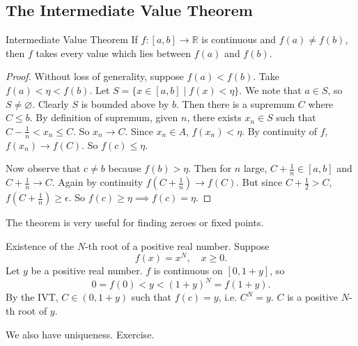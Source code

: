 \subsection{The Intermediate Value Theorem}
\leavevmode
\begin{theorem}{Intermediate Value Theorem}{}
    If \(f: [a,b]\to\mathbb{R}\) is continuous and \(f(a) \neq f(b)\), then \(f\) takes every value which lies between \(f(a)\) and \(f(b)\).
\end{theorem}
\begin{proof}
    Without loss of generality, suppose \(f(a) < f(b)\). Take \(f(a) < \eta < f(b)\). Let \(S = \{x \in [a,b]\mid f(x) < \eta\}\). We note that \(a \in S\), so \(S\neq \varnothing \). Clearly \(S\) is bounded above by \(b\). Then there is a supremum \(C\) where \(C \leq b\). By definition of supremum, given \(n\), there exists \(x_n \in S\) such that \(C - \frac{1}{n} < x_n \leq C\). So \(x_n \to C\). Since \(x_n \in A\), \(f(x_n) < \eta\). By continuity of \(f\), \(f(x_n) \to f(C)\). So \(f(c) \leq \eta\).
    
    Now observe that \(c \neq b\) because \(f(b) > \eta\). Then for \(n\) large, \(C + \frac{1}{n} \in [a,b]\) and \(C+\frac{1}{n}\to C\). Again by continuity \(f(C + \frac{1}{n})\to f(C)\). But since \(C + \frac{1}{2} > C\), \(f(C + \frac{1}{n})\geq \epsilon\). So \(f(c) \geq \eta \implies f(c) = \eta\).
\end{proof}
\begin{remark}
    The theorem is very useful for finding zeroes or fixed points.
\end{remark}
\begin{example}
    Existence of the \(N\)-th root of a positive real number. Suppose
    \[
        f(x) = x^N, \quad x\geq 0.
    \]
    Let \(y\) be a positive real number. \(f\) is continuous on \([0, 1 + y]\), so
    \[
        0 = f(0) < y < (1 + y)^N = f(1 + y).
    \]
    By the IVT, \(C \in (0, 1 + y)\) such that \(f(c) = y\), i.e. \(C^N = y\). \(C\) is a positive \(N\)-th root of \(y\).

    We also have uniqueness. Exercise.
\end{example}